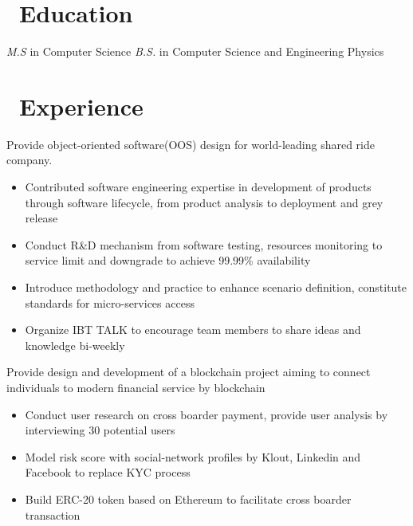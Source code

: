 \documentclass{resume}
\begin{document}



\section{\faGraduationCap\ Education}
\textit{M.S} in Computer Science
\textit{B.S.} in Computer Science and Engineering Physics

\section{\faUsers\ Experience}
Provide object-oriented software(OOS) design for world-leading shared ride company.
\begin{itemize}
  \item Contributed software engineering expertise in development of products through software lifecycle, from product analysis to deployment and grey release
  \item Conduct R\&D mechanism from software testing, resources monitoring to service limit and downgrade to achieve 99.99\% availability
  \item Introduce methodology and practice to enhance scenario definition, constitute standards for micro-services access
  \item Organize IBT TALK to encourage team members to share ideas and knowledge bi-weekly
\end{itemize}

Provide design and development of a blockchain project aiming to connect individuals to modern financial service by blockchain
\begin{itemize}
  \item Conduct user research on cross boarder payment, provide user analysis by interviewing 30 potential users
  \item Model risk score with social-network profiles by Klout, Linkedin and Facebook to replace KYC process
  \item Build ERC-20 token based on Ethereum to facilitate cross boarder transaction
\end{itemize}
\end{document}
